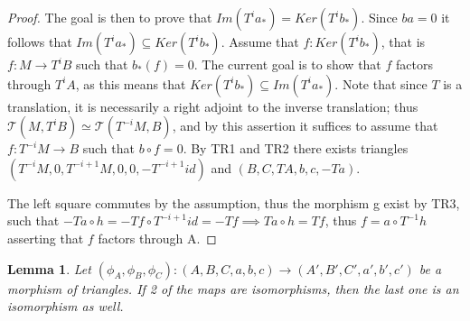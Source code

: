 \documentclass[11pt]{article}
\newtheorem{lemma}[theorem]{Lemma}
\theoremstyle{definition}
\theoremstyle{remark}
\begin{document}
\begin{proof}
                The goal is then to prove that $Im(T^ia_*)=Ker(T^ib_*)$. Since $ba=0$ it follows that $Im(T^ia_*) \subseteq Ker(T^ib_*)$. Assume that $f:Ker(T^ib_*)$, that is $f:M\rightarrow T^iB$ such that $b_*(f)=0$. The current goal is to show that $f$ factors through $T^iA$, as this means that $Ker(T^ib_*)\subseteq Im(T^ia_*)$. Note that since $T$ is a translation, it is necessarily a right adjoint to the inverse translation; thus $\mathcal{T}(M,T^iB) \simeq\mathcal{T}(T^{-i}M,B)$, and by this assertion it suffices to assume that $f:T^{-i}M\rightarrow B$ such that $b\circ f = 0$. By TR1 and TR2 there exists triangles $(T^{-i}M,0,T^{-i+1}M,0,0,-T^{-i+1}id)$ and $(B,C,TA,b,c,-Ta)$. 
                \begin{center}
                \end{center}
                The left square commutes by the assumption, thus the morphism g exist by TR3, such that $-Ta\circ h = -Tf\circ T^{-i+1}id = -Tf \implies Ta\circ h = Tf$, thus $f = a\circ T^{-1}h$ asserting that $f$ factors through A.
            \end{proof}
            \begin{lemma}
                Let $(\phi_A, \phi_B, \phi_C):(A,B,C,a,b,c) \rightarrow (A',B',C',a',b',c')$ be a morphism of triangles. If 2 of the maps are isomorphisms, then the last one is an isomorphism as well.
                \begin{center}
                \end{center}
            \end{lemma}
\end{document}
